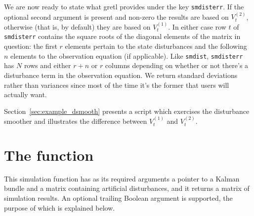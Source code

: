 We are now ready to state what gretl provides under the key
\texttt{smdisterr}. If the optional second argument is present and
non-zero the results are based on $V^{(2)}_t$, otherwise (that is, by
default) they are based on $V^{(1)}_t$. In either case row $t$ of
\texttt{smdisterr} contains the square roots of the diagonal elements
of the matrix in question: the first $r$ elements pertain to the state
disturbances and the following $n$ elements to the observation
equation (if applicable). Like \texttt{smdist}, \texttt{smdisterr} has
$N$ rows and either $r+n$ or $r$ columns depending on whether or not
there's a disturbance term in the observation equation. We return
standard deviations rather than variances since most of the time
it's the former that users will actually want.

Section~\ref{sec:example_dsmooth} presents a script which exercises
the disturbance smoother and illustrates the difference between
$V^{(1)}_t$ and $V^{(2)}_t$.


\section{The  function}
\label{sec:ksimul}

This simulation function has as its required arguments a pointer to a
Kalman bundle and a matrix containing artificial disturbances, and it
returns a matrix of simulation results. An optional trailing Boolean
argument is supported, the purpose of which is explained below.

